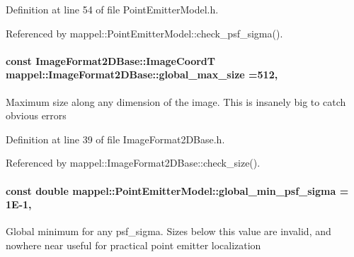Definition at line 54 of file Point\+Emitter\+Model.\+h.



Referenced by mappel\+::\+Point\+Emitter\+Model\+::check\+\_\+psf\+\_\+sigma().

\paragraph[{\texorpdfstring{global\+\_\+max\+\_\+size}{global_max_size}}]{\setlength{\rightskip}{0pt plus 5cm}const {\bf Image\+Format2\+D\+Base\+::\+Image\+CoordT} mappel\+::\+Image\+Format2\+D\+Base\+::global\+\_\+max\+\_\+size =512\hspace{0.3cm}{\ttfamily [static]}, {\ttfamily [inherited]}}\hypertarget{classmappel_1_1ImageFormat2DBase_a11c9bb87930f597dff17e9923b73bf5e}{}\label{classmappel_1_1ImageFormat2DBase_a11c9bb87930f597dff17e9923b73bf5e}
Maximum size along any dimension of the image. This is insanely big to catch obvious errors 

Definition at line 39 of file Image\+Format2\+D\+Base.\+h.



Referenced by mappel\+::\+Image\+Format2\+D\+Base\+::check\+\_\+size().

\paragraph[{\texorpdfstring{global\+\_\+min\+\_\+psf\+\_\+sigma}{global_min_psf_sigma}}]{\setlength{\rightskip}{0pt plus 5cm}const double mappel\+::\+Point\+Emitter\+Model\+::global\+\_\+min\+\_\+psf\+\_\+sigma = 1\+E-\/1\hspace{0.3cm}{\ttfamily [static]}, {\ttfamily [inherited]}}\hypertarget{classmappel_1_1PointEmitterModel_a77d0ca98d77cb8b94117ece2a5b182a4}{}\label{classmappel_1_1PointEmitterModel_a77d0ca98d77cb8b94117ece2a5b182a4}
Global minimum for any psf\+\_\+sigma. Sizes below this value are invalid, and nowhere near useful for practical point emitter localization 

